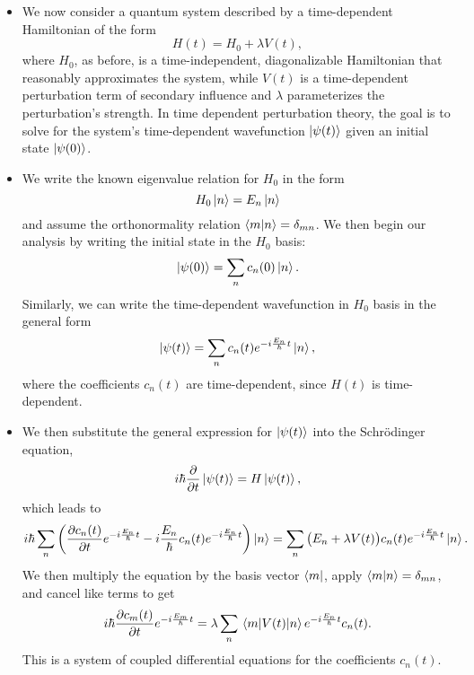 \documentclass[11pt, a4paper]{article}
\newcommand{\Schro}{Schr\"{o}dinger\xspace}
\newcommand{\Ham}{Hamiltonian\xspace}
\newcommand{\p}{\psi}  %
\begin{document}
\begin{itemize}
    \item We now consider a quantum system described by a time-dependent \Ham of the form
    \begin{equation*}
        H(t) = H_{0} + \lambda V(t),
    \end{equation*}
    where $ H_{0} $, as before, is a time-independent, diagonalizable \Ham that reasonably approximates the system, while $ V(t) $ is a time-dependent perturbation term of secondary influence and $ \lambda $ parameterizes the perturbation's strength. In time dependent perturbation theory, the goal is to solve for the system's time-dependent wavefunction $ \ket{\psi(t)} $ given an initial state $ \ket{\psi(0)} $.

    \item We write the known eigenvalue relation for $ H_{0} $ in the form
    \begin{equation*}
        H_{0} \ket{n} = E_{n} \ket{n}
    \end{equation*}
    and assume the orthonormality relation $ \braket{m}{n} = \delta_{mn} $. We then begin our analysis by writing the initial state in the $ H_{0} $ basis:
    \begin{equation*}
        \ket{\p(0)} = \sum_{n}c_{n}(0)\ket{n}.
    \end{equation*}
    Similarly, we can write the time-dependent wavefunction in $ H_{0} $ basis in the general form
    \begin{equation*}
        \ket{\psi(t)} = \sum_{n}c_{n}(t)e^{-i \frac{E_{n}}{\hbar}t}\ket{n},
    \end{equation*}
    where the coefficients $ c_{n}(t) $ are time-dependent, since $ H(t) $ is time-dependent. 

    \item We then substitute the general expression for $ \ket{\p(t)} $ into the \Schro equation,
    \begin{equation*}
        i \hbar \pdv{t}\ket{\psi(t)} = H \ket{\psi(t)},
    \end{equation*}
    which leads to
    \begin{equation*}
        i \hbar \sum_{n}\left( \pdv{c_{n}(t)}{t}e^{-i \frac{E_{n}}{\hbar}t} - i \frac{E_{n}}{\hbar}c_{n}(t)e^{-i \frac{E_{n}}{\hbar}t} \right)\ket{n} = \sum_{n}\big( E_{n} + \lambda V(t) \big)c_{n}(t)e^{-i \frac{E_{n}}{\hbar}t} \ket{n}.
    \end{equation*}
    We then multiply the equation by the basis vector $ \bra{m} $, apply $ \braket{m}{n} = \delta_{mn} $, and cancel like terms to get
    \begin{equation*}
        i \hbar \pdv{c_{m}(t)}{t}e^{-i \frac{E_{m}}{\hbar}t} = \lambda \sum_{n} \mel{m}{V(t)}{n}e^{-i \frac{E_{n}}{\hbar}t} c_{n}(t).
    \end{equation*}
    This is a system of coupled differential equations for the coefficients $ c_{n}(t) $.


\end{itemize}
\end{document}
